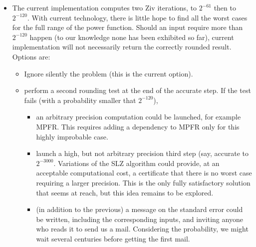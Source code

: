 \begin{itemize}
\item The current implementation computes two Ziv iterations, to
  $2^{-61}$ then to $2^{-120}$. With current technology, there is
  little hope to find all the worst cases for the full range of the
  power function. Should an input require more than $2^{-120}$ happen
  (to our knowledge none has been exhibited so far), current
  implementation will not necessarily return the correctly rounded
  result. Options are:
  \begin{itemize}
  \item Ignore silently the problem (this is the current option).
  \item perform a second rounding test at the end of the accurate
    step. If the test fails (with a  probability
      smaller that $2^{-120}$),
    \begin{itemize}
    \item an arbitrary precision computation could be launched, for
      example MPFR. This requires adding a dependency to MPFR only for
      this highly improbable case.
    \item launch a high, but not arbitrary precision third step (say,
      accurate to $2^{-3000}$. Variations of the SLZ algorithm
      \cite{Stehle-thesis} could provide, at an acceptable
      computational cost, a certificate that there is no worst case
      requiring a larger precision. This is the only fully satisfactory solution that seems at reach, but this idea remains to be explored.
    \item (in addition to the previous) a message on the standard error could be written, including
      the corresponding inputs, and inviting anyone who reads it to
      send us a mail. Considering the probability, we might wait
      several centuries before getting the first mail.
    \end{itemize}

  \end{itemize}



\end{itemize}




